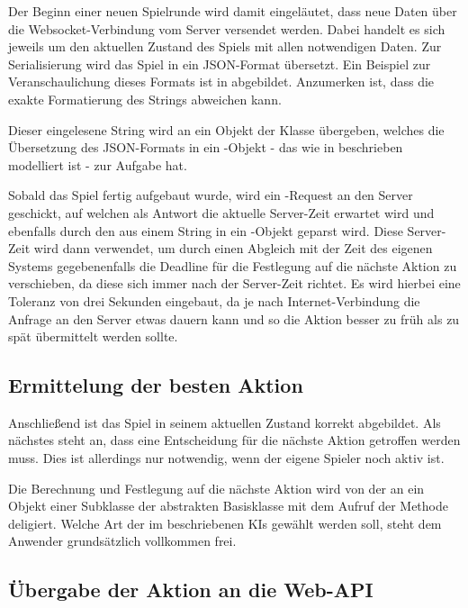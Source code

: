 Der Beginn einer neuen Spielrunde wird damit eingeläutet, dass neue Daten über die Websocket-Verbindung vom Server
versendet werden.
Dabei handelt es sich jeweils um den aktuellen Zustand des Spiels mit allen notwendigen Daten.
Zur Serialisierung wird das Spiel in ein JSON-Format übersetzt.
Ein Beispiel zur Veranschaulichung dieses Formats ist in  abgebildet.
Anzumerken ist, dass die exakte Formatierung des Strings abweichen kann.

Dieser eingelesene String wird an ein Objekt der Klasse  übergeben, welches die Übersetzung des
JSON-Formats in ein -Objekt - das wie in  beschrieben modelliert ist - zur Aufgabe
hat.

Sobald das Spiel fertig aufgebaut wurde, wird ein -Request an den Server geschickt, auf welchen als Antwort
die aktuelle Server-Zeit erwartet wird und ebenfalls durch den  aus einem String in ein
-Objekt geparst wird.
Diese Server-Zeit wird dann verwendet, um durch einen Abgleich mit der Zeit des eigenen Systems gegebenenfalls die
Deadline für die Festlegung auf die nächste Aktion zu verschieben, da diese sich immer nach der Server-Zeit richtet.
Es wird hierbei eine Toleranz von drei Sekunden eingebaut, da je nach Internet-Verbindung die Anfrage an den Server
etwas dauern kann und so die Aktion besser zu früh als zu spät übermittelt werden sollte.

\subsection{Ermittelung der besten Aktion}
\label{subsec:ermitteln-aktion}

Anschließend ist das Spiel in seinem aktuellen Zustand korrekt abgebildet.
Als nächstes steht an, dass eine Entscheidung für die nächste Aktion getroffen werden muss.
Dies ist allerdings nur notwendig, wenn der eigene Spieler noch aktiv ist.

Die Berechnung und Festlegung auf die nächste Aktion wird von der  an ein Objekt einer
Subklasse der abstrakten Basisklasse  mit dem Aufruf der Methode
 deligiert.
Welche Art der im  beschriebenen \ac{KI}s gewählt werden soll, steht dem Anwender
grundsätzlich vollkommen frei.

\subsection{Übergabe der Aktion an die Web-API}
\label{subsec:uebergabe-aktion}

